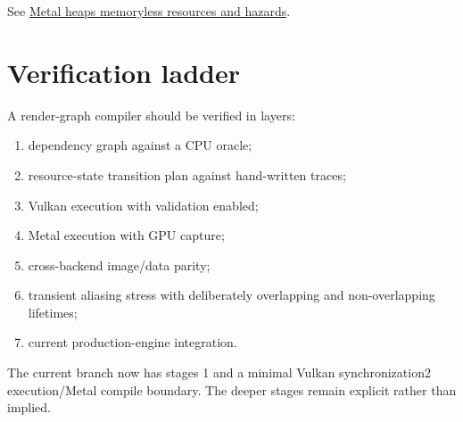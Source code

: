 See \hyperref[appendix-563b2cb23fc3]{Metal heaps memoryless resources and hazards}.

\section{Verification ladder}\label{appendix-0fc95374cb7e-verification-ladder}

A render-graph compiler should be verified in layers:

\begin{enumerate}
\def\labelenumi{\arabic{enumi}.}
\tightlist
\item
  dependency graph against a CPU oracle;
\item
  resource-state transition plan against hand-written traces;
\item
  Vulkan execution with validation enabled;
\item
  Metal execution with GPU capture;
\item
  cross-backend image/data parity;
\item
  transient aliasing stress with deliberately overlapping and non-overlapping lifetimes;
\item
  current production-engine integration.
\end{enumerate}

The current branch now has stages 1 and a minimal Vulkan synchronization2 execution/Metal compile boundary. The deeper stages remain explicit rather than implied.

